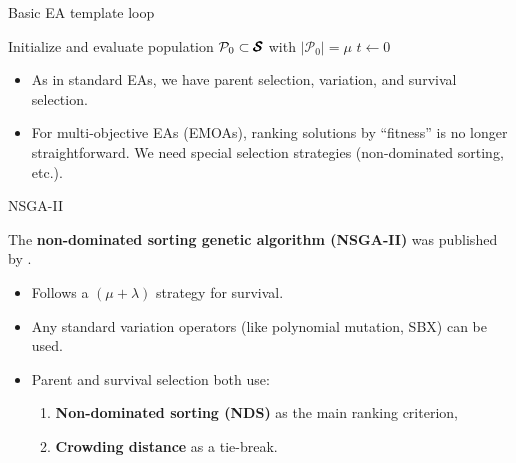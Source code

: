 \documentclass[11pt,compress,t,notes=noshow,xcolor=table]{beamer}
\newcommand{\XX}{\pcs}     %
\begin{document}
\begin{vbframe}{Basic EA template loop}

\begin{algorithm2e}[H]
\SetAlgoLined         %
\caption{Basic EA template loop}


Initialize and evaluate population $\mathcal{P}_0 \subset \XX$ with $|\mathcal{P}_0| = \mu$\;
$t \gets 0$\;

\end{algorithm2e}


\bigskip
\begin{itemize}
  \item As in standard EAs, we have parent selection, variation, and survival selection.
  \item For multi-objective EAs (EMOAs), ranking solutions by “fitness” is no longer straightforward. We need special selection strategies (non-dominated sorting, etc.).
\end{itemize}

\end{vbframe}

\begin{vbframe}{NSGA-II}

The \textbf{non-dominated sorting genetic algorithm (NSGA-II)} was published by
.

\begin{itemize}
\item Follows a $(\mu + \lambda)$ strategy for survival.
\item Any standard variation operators (like polynomial mutation, SBX) can be used.
\item Parent and survival selection both use:
  \begin{enumerate}
    \item \textbf{Non-dominated sorting (NDS)} as the main ranking criterion,
    \item \textbf{Crowding distance} as a tie-break.
  \end{enumerate}
\end{itemize}

\end{vbframe}
\end{document}
